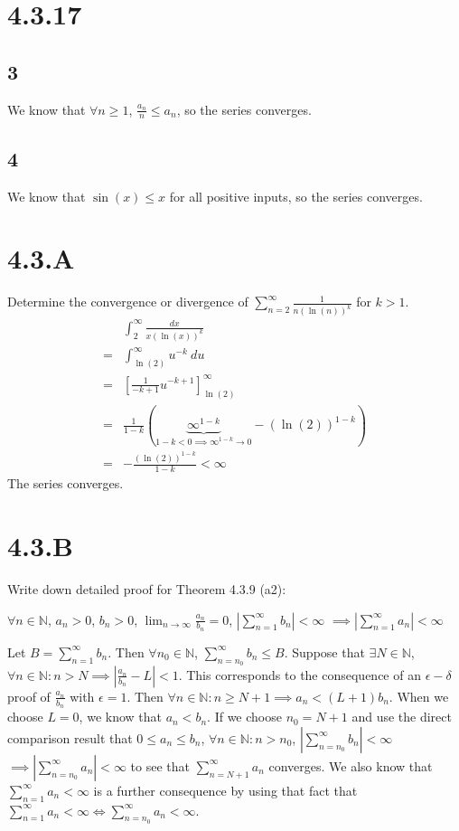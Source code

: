 \documentclass[12pt]{article}
\newcommand{\round}[1]{\left(       #1 \right)      }
\newcommand{\hard} [1]{\left[       #1 \right]      }
\newcommand{\abs}  [1]{\left|       #1 \right|      }
\newcommand{\N}    [0]{\mathbb{N}                   }
\newcommand{\iif}  [0]{\Longleftrightarrow          }
\begin{document}
\section*{4.3.17}

\subsection*{3}
We know that $\forall n \geq 1$, $\frac{a_n}{n} \leq a_n$, so the series converges.

\subsection*{4}
We know that $\sin(x) \leq x$ for all positive inputs, so the series converges.



\section*{4.3.A}
Determine the convergence or divergence of $\sum_{n=2}^\infty \frac{1}{n(\ln(n))^{k}}$ for $k>1$.
\begin{align*}
     & \int_{2}^\infty \frac{dx}{x (\ln(x))^k} \\
    =& \int_{\ln(2)}^\infty u^{-k}\ du \\
    =& \hard{\frac{1}{-k+1} u^{-k+1}}_{\ln(2)}^\infty \\
    =& \frac{1}{1-k} \round{\underbrace{\infty^{1-k}}_{1-k<0 \implies \infty^{1-k} \to 0} - (\ln(2))^{1-k}} \\
    =& -\frac{(\ln(2))^{1-k}}{1-k} < \infty
\end{align*}
The series converges.



\section*{4.3.B}
Write down detailed proof for Theorem 4.3.9 (a2):

$\forall n \in \N$, $a_n > 0$, $b_n > 0$, $\lim_{n\to\infty} \frac{a_n}{b_n} = 0$, $\abs{\sum_{n=1}^\infty b_n} < \infty$ $\implies \abs{\sum_{n=1}^\infty a_n} < \infty$

\bigskip\medskip

Let $B = \sum_{n=1}^\infty b_n$. Then $\forall n_0 \in \N$, $\sum_{n=n_0}^\infty b_n \leq B$. Suppose that $\exists N \in \N$, $\forall n \in \N : n > N \implies \abs{\frac{a_n}{b_n} - L} < 1$. This corresponds to the consequence of an $\epsilon - \delta$ proof of $\frac{a_n}{b_n}$ with $\epsilon = 1$. Then $\forall n \in \N : n \geq N+1 \implies a_n < (L+1)b_n$. When we choose $L=0$, we know that $a_n < b_n$. If we choose $n_0 = N+1$ and use the direct comparison result that $0 \leq a_n \leq b_n$, $\forall n \in \N : n > n_0$, $\abs{\sum_{n=n_0}^\infty b_n} < \infty$ $\implies \abs{\sum_{n=n_0}^\infty a_n} < \infty$ to see that $\sum_{n=N+1}^\infty a_n$ converges. We also know that $\sum_{n=1}^\infty a_n < \infty$ is a further consequence by using that fact that $\sum_{n=1}^\infty a_n < \infty \iif \sum_{n=n_0}^\infty a_n < \infty$.
\end{document}

